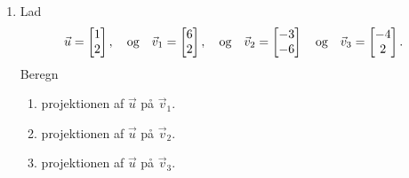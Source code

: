 \begin{enumerate}
	\item Lad 
	\begin{align*}
	\vec{u}=\begin{bmatrix}
	1\\2
	\end{bmatrix}, \quad \textup{og} \quad \vec{v}_1=\begin{bmatrix}
	6\\2
	\end{bmatrix},\quad \textup{og} \quad \vec{v}_2=\begin{bmatrix}
	-3\\-6
	\end{bmatrix}\quad \textup{og} \quad \vec{v}_3=\begin{bmatrix}
	-4\\2
	\end{bmatrix}.
	\end{align*}
	Beregn 
	\begin{enumerate}
		\item projektionen af $\vec{u}$ på $\vec{v}_1$.
		\item projektionen af $\vec{u}$ på $\vec{v}_2$.
		\item projektionen af $\vec{u}$ på $\vec{v}_3$.
	\end{enumerate}

\end{enumerate}